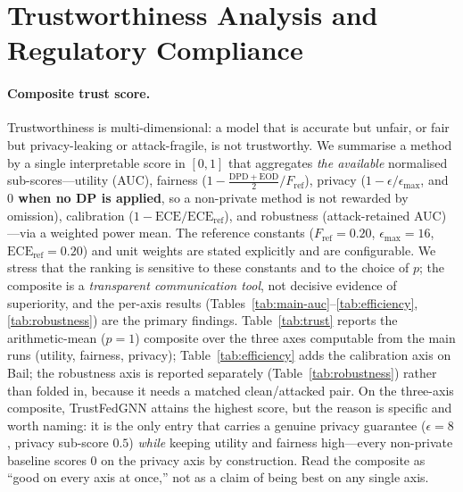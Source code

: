 \documentclass[pdflatex,sn-mathphys-num]{sn-jnl}
\theoremstyle{thmstyleone}%
\theoremstyle{thmstyletwo}%
\theoremstyle{thmstylethree}%
\newcommand{\dpd}{\mathrm{DPD}}
\newcommand{\eod}{\mathrm{EOD}}
\begin{document}
\begin{table}[t]\centering\small
\caption{Million-node scaling study (ogbn-products, $2.4$M nodes, $123$M
edges, $K{=}3$ clients, $15$ rounds, CPU). $^{\ast}$2026 baseline.
$^{\dagger}$DPD/EOD is a spurious artefact of a collapsed (near-chance)
classifier, not a genuine fairness result---see discussion above.}
\label{tab:large-scale}

\end{table}

\begin{table}[t]\centering\small
\caption{Calibration, uncertainty, and efficiency (Bail). ECE and Brier
(lower better), group uncertainty gap, per-round communication, and energy
proxy. TrustFedGNN matches FedAvg's communication footprint.}
\label{tab:efficiency}

\end{table}

\section{Trustworthiness Analysis and Regulatory Compliance}
\label{sec:trust}

\paragraph{Composite trust score.}
Trustworthiness is multi-dimensional: a model that is accurate but unfair, or
fair but privacy-leaking or attack-fragile, is not trustworthy. We summarise a
method by a single interpretable score in $[0,1]$ that aggregates \emph{the
available} normalised sub-scores---utility (AUC), fairness
($1-\tfrac{\dpd+\eod}{2}/F_{\text{ref}}$), privacy ($1-\epsilon/\epsilon_{\max}$,
and \textbf{$0$ when no DP is applied}, so a non-private method is not rewarded
by omission), calibration ($1-\mathrm{ECE}/\mathrm{ECE}_{\text{ref}}$), and
robustness (attack-retained AUC)---via a weighted power mean. The reference
constants ($F_{\text{ref}}{=}0.20$, $\epsilon_{\max}{=}16$,
$\mathrm{ECE}_{\text{ref}}{=}0.20$) and unit weights are stated explicitly and
are configurable. We stress that the ranking is sensitive to these constants and
to the choice of $p$; the composite is a \emph{transparent communication tool},
not decisive evidence of superiority, and the per-axis results
(Tables~\ref{tab:main-auc}--\ref{tab:efficiency}, \ref{tab:robustness}) are the
primary findings. Table~\ref{tab:trust} reports the arithmetic-mean ($p{=}1$)
composite over the three axes computable from the main runs (utility, fairness,
privacy); Table~\ref{tab:efficiency} adds the calibration axis on Bail; the
robustness axis is reported separately (Table~\ref{tab:robustness}) rather than
folded in, because it needs a matched clean/attacked pair. On the three-axis
composite, TrustFedGNN attains the highest score, but the reason is specific and
worth naming: it is the only entry that carries a genuine privacy guarantee
($\epsilon{=}8$, privacy sub-score $0.5$) \emph{while} keeping utility and
fairness high---every non-private baseline scores $0$ on the privacy axis by
construction. Read the composite as ``good on every axis at once,'' not as a
claim of being best on any single axis.
\end{document}
